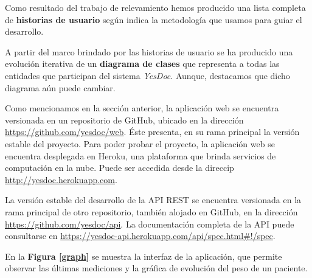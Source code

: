 \documentclass[a4paper,twocolumn,12pt]{article}
\begin{document}
Como resultado del trabajo de relevamiento %
hemos producido una lista completa de \textbf{historias de usuario} según indica la metodología que usamos para guiar el desarrollo.

A partir del marco brindado por las historias de usuario se ha producido una evolución iterativa de un \textbf{diagrama de clases} que representa a todas las entidades que participan del sistema \textit{YesDoc}. Aunque, destacamos que dicho diagrama aún puede cambiar. %



Como mencionamos en la sección anterior, la aplicación web se encuentra versionada en un repositorio de GitHub, ubicado en la dirección \url{https://github.com/yesdoc/web}. Éste presenta, en su rama principal la versión estable del proyecto.
Para poder probar el proyecto, la aplicación web se encuentra desplegada en Heroku, una plataforma que brinda servicios de computación en la nube. Puede ser accedida desde la direccip \url{http://yesdoc.herokuapp.com}.

La versión estable del desarrollo de la API REST se encuentra versionada en la rama principal de otro repositorio, también alojado en GitHub, en la dirección \url{https://github.com/yesdoc/api}.
La documentación completa de la API puede consultarse en \url{https://yesdoc-api.herokuapp.com/api/spec.html#!/spec}.

En la \textbf{Figura \ref{graph}} se muestra la interfaz de la aplicación, que permite observar las últimas mediciones y la gráfica de evolución del peso de un paciente.
\end{document}
